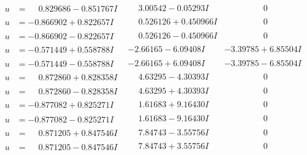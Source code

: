 \documentclass[1p]{elsarticle_modified}
\theoremstyle{definition}
\begin{document}
$$\begin{array}{c|c|c}
\begin{aligned}
u &= \phantom{-}0.829686 - 0.851767 I\end{aligned}
 & \phantom{-}3.00542 - 0.05293 I & \phantom{-0.000000 } 0 \\ \hline\begin{aligned}
u &= -0.866902 + 0.822657 I\end{aligned}
 & \phantom{-}0.526126 + 0.450966 I & \phantom{-0.000000 } 0 \\ \hline\begin{aligned}
u &= -0.866902 - 0.822657 I\end{aligned}
 & \phantom{-}0.526126 - 0.450966 I & \phantom{-0.000000 } 0 \\ \hline\begin{aligned}
u &= -0.571449 + 0.558788 I\end{aligned}
 & -2.66165 - 6.09408 I & -3.39785 + 6.85504 I \\ \hline\begin{aligned}
u &= -0.571449 - 0.558788 I\end{aligned}
 & -2.66165 + 6.09408 I & -3.39785 - 6.85504 I \\ \hline\begin{aligned}
u &= \phantom{-}0.872860 + 0.828358 I\end{aligned}
 & \phantom{-}4.63295 - 4.30393 I & \phantom{-0.000000 } 0 \\ \hline\begin{aligned}
u &= \phantom{-}0.872860 - 0.828358 I\end{aligned}
 & \phantom{-}4.63295 + 4.30393 I & \phantom{-0.000000 } 0 \\ \hline\begin{aligned}
u &= -0.877082 + 0.825271 I\end{aligned}
 & \phantom{-}1.61683 + 9.16430 I & \phantom{-0.000000 } 0 \\ \hline\begin{aligned}
u &= -0.877082 - 0.825271 I\end{aligned}
 & \phantom{-}1.61683 - 9.16430 I & \phantom{-0.000000 } 0 \\ \hline\begin{aligned}
u &= \phantom{-}0.871205 + 0.847546 I\end{aligned}
 & \phantom{-}7.84743 - 3.55756 I & \phantom{-0.000000 } 0 \\ \hline\begin{aligned}
u &= \phantom{-}0.871205 - 0.847546 I\end{aligned}
 & \phantom{-}7.84743 + 3.55756 I & \phantom{-0.000000 } 0 \\ \hline\begin{aligned}

\end{aligned}
\end{array}$$
\end{document}
